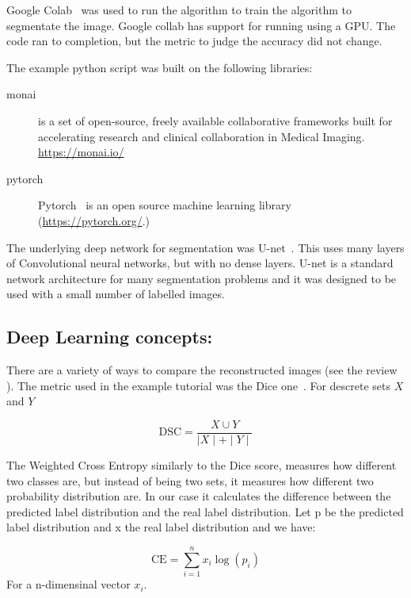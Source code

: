 \documentclass[12pt]{article}
\begin{document}
Google Colab~\cite{bisong2019google} was used to run the algorithm
to train the algorithm to segmentate the image. Google collab
has support for running using a GPU. The code ran to completion,
but the metric to judge the accuracy did not change.


The example python script was built on the following libraries:

\begin{description}

  \item[monai] is a set of open-source, freely available collaborative frameworks built for accelerating research and clinical collaboration in Medical Imaging.  \url{https://monai.io/}

\item[pytorch] Pytorch~\cite{paszke2019pytorch}
  is an open source machine learning library  (\url{https://pytorch.org/}.)
    
\end{description}

The underlying deep network for segmentation was
U-net~\cite{ronneberger2015u}.  This uses many layers of Convolutional
neural networks, but with no dense layers.  U-net is a standard
network architecture for many segmentation problems and it was
designed to be used with a small number of labelled images.


\subsection{Deep Learning concepts:}

There are a variety of ways to compare the reconstructed images (see
the review~\cite{taha2015metrics} ).  The metric used in the example
tutorial was the Dice one~\cite{zijdenbos1994morphometric}.
For descrete sets $X$ and $Y$ 

\begin{equation}
\mbox{DSC} = \frac{X \cup  Y} {\mid X \mid + \mid Y \mid }
\end{equation}
  
The Weighted Cross Entropy  similarly to the Dice score,
measures how different two classes are, but instead of being two sets,
it measures how different two probability distribution are. In our
case it calculates the difference between the predicted label
distribution and the real label distribution. Let p be the predicted
label distribution and x the real label distribution and we have:

\begin{equation}
\mbox{CE} = \sum_{i=1}^{n} x_i \log(p_i)
\end{equation}
For a n-dimensinal vector $x_i$.
\end{document}
